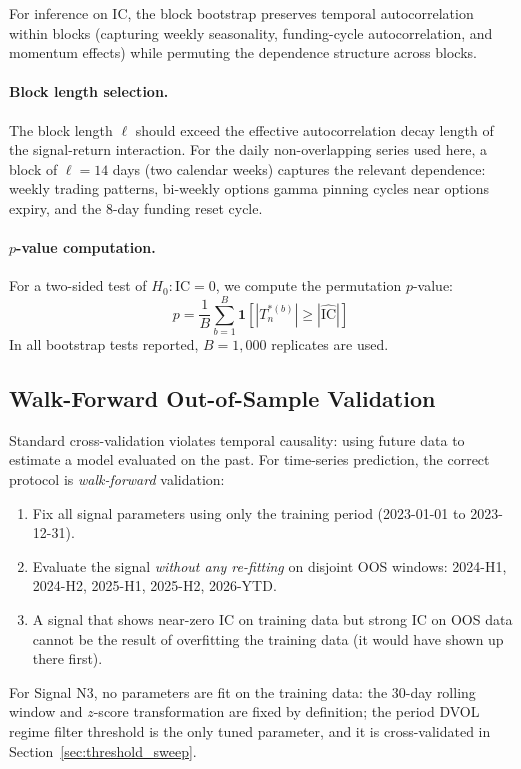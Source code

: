 \documentclass[12pt, a4paper]{article}
\theoremstyle{plain}
\theoremstyle{definition}
\newcommand{\IC}{\mathrm{IC}}
\begin{document}
For inference on $\IC$, the block bootstrap preserves temporal autocorrelation
within blocks (capturing weekly seasonality, funding-cycle autocorrelation,
and momentum effects) while permuting the dependence structure across blocks.

\paragraph{Block length selection.}
The block length $\ell$ should exceed the effective autocorrelation decay
length of the signal-return interaction. For the daily non-overlapping series
used here, a block of $\ell = 14$ days (two calendar weeks) captures the
relevant dependence: weekly trading patterns, bi-weekly options gamma pinning
cycles near options expiry, and the 8-day funding reset cycle.

\paragraph{$p$-value computation.}
For a two-sided test of $H_0 : \IC = 0$, we compute the permutation $p$-value:
\[
  p = \frac{1}{B}\sum_{b=1}^B \mathbf{1}\!\left[|T_n^{*(b)}| \geq |\widehat{\IC}|\right]
\]
In all bootstrap tests reported, $B = 1{,}000$ replicates are used.

\subsection{Walk-Forward Out-of-Sample Validation}
\label{sec:walkforward}

Standard cross-validation violates temporal causality: using future data to
estimate a model evaluated on the past. For time-series prediction, the
correct protocol is \emph{walk-forward} validation:

\begin{enumerate}[noitemsep]
  \item Fix all signal parameters using only the training period
        (2023-01-01 to 2023-12-31).
  \item Evaluate the signal \emph{without any re-fitting} on disjoint
        OOS windows: 2024-H1, 2024-H2, 2025-H1, 2025-H2, 2026-YTD.
  \item A signal that shows near-zero IC on training data but strong IC
        on OOS data cannot be the result of overfitting the training data
        (it would have shown up there first).
\end{enumerate}

For Signal N3, no parameters are fit on the training data: the 30-day rolling
window and $z$-score transformation are fixed by definition; the period
DVOL regime filter threshold is the only tuned parameter, and it
is cross-validated in Section~\ref{sec:threshold_sweep}.
\end{document}
